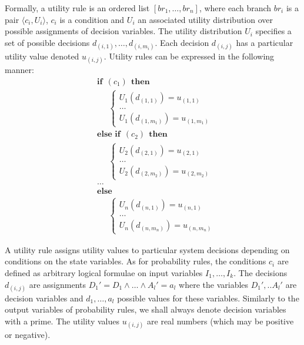 Formally, a utility rule is an ordered list $[ br_1, \dots, br_n]$, where each branch $br_i$ is a pair $\langle c_i, U_i \rangle$, $c_i$ is a condition and $U_i$ an associated utility distribution over possible assignments of decision variables. The utility distribution $U_i$ specifies a set of possible decisions $d_{(i,1)}, \dots, d_{(i,m_i)}$.  Each decision $d_{(i,j)}$ has a particular utility value denoted $u_{(i,j)}$.  Utility rules can be expressed in the following manner:
\begin{equation}
\begin{aligned}
& \textbf{if} \ \ (c_{1}) \ \ \textbf{then} \\ 
& \;\;\;\;\; \begin{cases}
U_1(d_{(1,1)}) = u_{(1,1)} \\
 \dots \\
U_1(d_{(1,m_1)}) = u_{(1,m_1)} 
\end{cases} \\[3mm]
& \textbf{else if} \ \ (c_{2}) \ \ \textbf{then} \\ 
& \;\;\;\;\; \begin{cases}
U_2(d_{(2,1)}) = u_{(2,1)} \\
 \dots \\
U_2(d_{(2,m_2)}) = u_{(2,m_2)} 
\end{cases} \\
& \dots  \\
& \textbf{else} \\
& \;\;\;\;\; \begin{cases}
U_n(d_{(n,1)}) = u_{(n,1)} \\
 \dots \\
U_n(d_{(n,m_n)}) = u_{(n,m_n)}
\end{cases}
\end{aligned}
\end{equation}

A utility rule assigns utility values to particular system decisions depending on conditions on the state variables.  As for probability rules, the conditions $c_i$ are defined as arbitrary logical formulae on input variables $I_1, \dots, I_k$.  The decisions $d_{(i,j)}$ are assignments $D_1'\!=\!D_1 \land \dots \land A_{l}'\!=\!a_{l}$ where the variables $D_1',..A_{l}'$ are decision variables and $d_1, \dots, a_{l}$ possible values for these variables. Similarly to the output variables of probability rules, we shall always denote decision variables with a prime. The utility values $u_{(i,j)}$ are real numbers (which may be positive or negative).  

